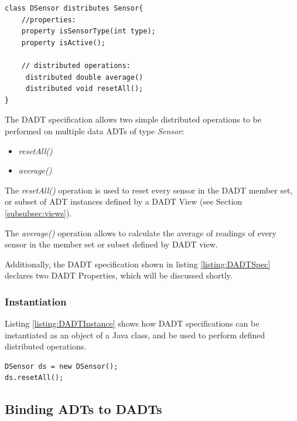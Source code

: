 \begin{lstlisting}[frame=trbl, basewidth={0.55em, 0.6em}, captionpos=b, 
basicstyle=\ttfamily\footnotesize, breaklines, caption = Data DADT 
specification (reproduced from \cite{migliavacca_DADT:2006}), label = listing:DADTSpec]
class DSensor distributes Sensor{	
  	//properties:
	property isSensorType(int type);
	property isActive();

	// distributed operations:
     distributed double average()	
	 distributed void resetAll();
}
\end{lstlisting} 
 
The DADT specification allows two simple distributed operations to be performed
on multiple data ADTs of type \emph{Sensor}:  
\begin{itemize}
\item \emph{resetAll()} 
\item \emph{average()} 
\end{itemize}

The \emph{resetAll()} operation is used to reset every sensor in the DADT member
set, or subset of ADT instances defined by a DADT View (see Section
\ref{subsubsec:views}).

The \emph{average()} operation allows to calculate the average of readings of every
sensor in the member set or subset defined by DADT view.

Additionally, the DADT specification  shown in listing \ref{listing:DADTSpec} declares two DADT Properties, which will
be discussed shortly.

\subsubsection{Instantiation}

Listing \ref{listing:DADTInstance} shows how DADT specifications can be
instantiated as an object of a Java class, and be used to perform defined
distributed operations.

\begin{lstlisting}[frame=trbl, basewidth={0.55em, 0.6em}, captionpos=b, 
basicstyle=\ttfamily\footnotesize, breaklines, caption = DADT Instantiation 
(reproduced from \cite{migliavacca_DADT:2006}), label = listing:DADTInstance ]
DSensor ds = new DSensor();
ds.resetAll();
\end{lstlisting}

\subsection{Binding ADTs to DADTs}


